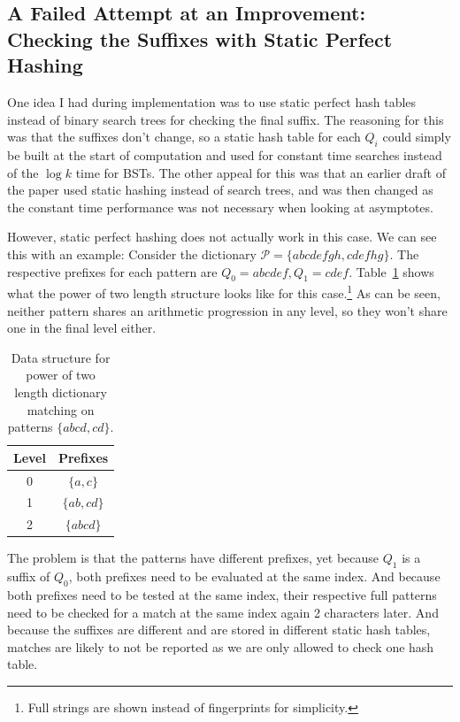 \documentclass[ %
                    author={Dominic Joseph Moylett},
                    degree={MEng},
                     title={Dictionary Matching with Fingerprints},
                  subtitle={An Empirical Analysis},
                      type={research},
                      year={2015} ]{dissertation}
\begin{document}
\subsection{A Failed Attempt at an Improvement: Checking the Suffixes with Static Perfect Hashing}
\label{ssec:static-hash-fail}

One idea I had during implementation was to use static perfect hash tables instead of binary search trees for checking the final suffix. The reasoning for this was that the suffixes don't change, so a static hash table for each $Q_i$ could simply be built at the start of computation and used for constant time searches instead of the $\log k$ time for BSTs. The other appeal for this was that an earlier draft of the paper used static hashing instead of search trees, and was then changed as the constant time performance was not necessary when looking at asymptotes.

However, static perfect hashing does not actually work in this case. We can see this with an example: Consider the dictionary $\mathcal{P} = \{abcdefgh, cdefhg\}$. The respective prefixes for each pattern are $Q_0 = abcdef, Q_1 = cdef$. Table~\ref{tab:static-hash-fail} shows what the power of two length structure looks like for this case.\footnote{Full strings are shown instead of fingerprints for simplicity.} As can be seen, neither pattern shares an arithmetic progression in any level, so they won't share one in the final level either.

\begin{table}[t]
  \centering
  \begin{tabular}{|c|c|}
    \hline
    Level & Prefixes \\\hline
    0 & $\{a, c\}$ \\\hline
    1 & $\{ab, cd\}$ \\\hline
    2 & $\{abcd\}$ \\\hline
  \end{tabular}
  \caption{Data structure for power of two length dictionary matching on patterns $\{abcd, cd\}$.}
  \label{tab:static-hash-fail}
\end{table}

The problem is that the patterns have different prefixes, yet because $Q_1$ is a suffix of $Q_0$, both prefixes need to be evaluated at the same index. And because both prefixes need to be tested at the same index, their respective full patterns need to be checked for a match at the same index again 2 characters later. And because the suffixes are different and are stored in different static hash tables, matches are likely to not be reported as we are only allowed to check one hash table.
\end{document}
